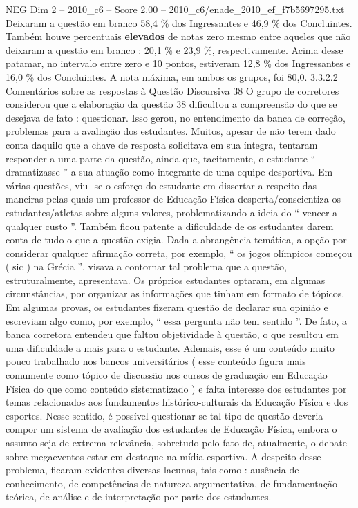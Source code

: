 \begin{textsample}{NEG Dim 2 – 2010\_c6 – Score 2.00 – 2010\_c6/enade\_2010\_ef\_f7b5697295.txt}
Deixaram a questão em branco 58,4 \% dos Ingressantes e 46,9 \% dos Concluintes.
Também houve percentuais \textbf{elevados} de notas zero mesmo entre aqueles que não deixaram a questão em branco : 20,1 \% e 23,9 \%, respectivamente.
Acima desse patamar, no intervalo entre zero e 10 pontos, estiveram 12,8 \% dos Ingressantes e 16,0 \% dos Concluintes.
A nota máxima, em ambos os grupos, foi 80,0. 3.3.2.2 Comentários sobre as respostas à Questão Discursiva 38 O grupo de corretores considerou que a elaboração da questão 38 dificultou a compreensão do que se desejava de fato : questionar.
Isso gerou, no entendimento da banca de correção, problemas para a avaliação dos estudantes.
Muitos, apesar de não terem dado conta daquilo que a chave de resposta solicitava em sua íntegra, tentaram responder a uma parte da questão, ainda que, tacitamente, o estudante “ dramatizasse ” a sua atuação como integrante de uma equipe desportiva.
Em várias questões, viu -se o esforço do estudante em dissertar a respeito das maneiras pelas quais um professor de Educação Física desperta/conscientiza os estudantes/atletas sobre alguns valores, problematizando a ideia do “ vencer a qualquer custo ”.
Também ficou patente a dificuldade de os estudantes darem conta de tudo o que a questão exigia.
Dada a abrangência temática, a opção por considerar qualquer afirmação correta, por exemplo, “ os jogos olímpicos começou ( sic ) na Grécia ”, visava a contornar tal problema que a questão, estruturalmente, apresentava.
Os próprios estudantes optaram, em algumas circunstâncias, por organizar as informações que tinham em formato de tópicos.
Em algumas provas, os estudantes fizeram questão de declarar sua opinião e escreviam algo como, por exemplo, “ essa pergunta não tem sentido ”.
De fato, a banca corretora entendeu que faltou objetividade à questão, o que resultou em uma dificuldade a mais para o estudante.
Ademais, esse é um conteúdo muito pouco trabalhado nos bancos universitários ( esse conteúdo figura mais comumente como tópico de discussão nos cursos de graduação em Educação Física do que como conteúdo sistematizado ) e falta interesse dos estudantes por temas relacionados aos fundamentos histórico-culturais da Educação Física e dos esportes.
Nesse sentido, é possível questionar se tal tipo de questão deveria compor um sistema de avaliação dos estudantes de Educação Física, embora o assunto seja de extrema relevância, sobretudo pelo fato de, atualmente, o debate sobre megaeventos estar em destaque na mídia esportiva.
A despeito desse problema, ficaram evidentes diversas lacunas, tais como : ausência de conhecimento, de competências de natureza argumentativa, de fundamentação teórica, de análise e de interpretação por parte dos estudantes.

\end{textsample}
